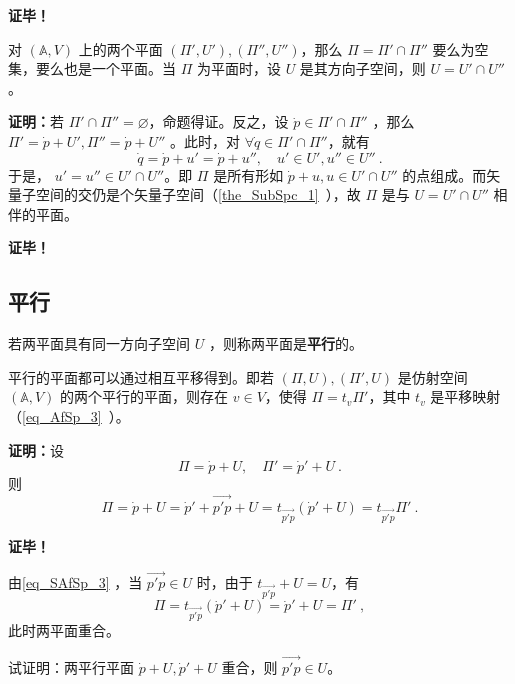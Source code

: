 \textbf{证毕！}
\begin{corollary}{}
对 $(\mathbb A,V)$ 上的两个平面 $(\Pi',U'),(\Pi'',U'')$，那么 $\Pi=\Pi'\cap\Pi''$ 要么为空集，要么也是一个平面。当 $\Pi$ 为平面时，设 $U$ 是其方向子空间，则 $U=U'\cap U''$。
\end{corollary}
\textbf{证明：}若 $\Pi'\cap\Pi''=\varnothing$，命题得证。反之，设 $\dot p\in \Pi'\cap\Pi''$ ，那么 $\Pi'=\dot p+U',\Pi''=\dot p+U''$ 。此时，对 $\forall\dot q\in\Pi'\cap\Pi''$，就有 \begin{equation}
\dot q=\dot p+u'=\dot p+u'',\quad u'\in U',u''\in U''~.
\end{equation}
于是， $u'=u''\in U'\cap U''$。即 $\Pi$ 是所有形如 $\dot p+u,u\in U'\cap U''$ 的点组成。而矢量子空间的交仍是个矢量子空间（\autoref{the_SubSpc_1}~），故 $\Pi$ 是与 $U=U'\cap U''$ 相伴的平面。

\textbf{证毕！}
\subsection{平行}

\begin{definition}{}
若两平面具有同一方向子空间 $U$ ，则称两平面是\textbf{平行}的。
\end{definition}
\begin{theorem}{}
平行的平面都可以通过相互平移得到。即若 $(\Pi,U),(\Pi',U)$ 是仿射空间 $(\mathbb A,V)$ 的两个平行的平面，则存在 $v\in V$，使得 $\Pi=t_{v}\Pi'$，其中 $t_v$ 是平移映射（\autoref{eq_AfSp_3}~）。
\end{theorem}
\textbf{证明：}设
\begin{equation}
\Pi=\dot p+U,\quad \Pi'=\dot p'+U~.
\end{equation}
则
\begin{equation}\label{eq_SAfSp_3}
\Pi=\dot p+U=\dot p'+\overrightarrow{p'p}+U=t_{\overrightarrow{p'p}}(\dot p'+U)=t_{\overrightarrow{p'p}} \Pi'~.
\end{equation}

\textbf{证毕！}

由\autoref{eq_SAfSp_3} ，当 $\overrightarrow{p'p}\in U$ 时，由于 $t_{\overrightarrow{p'p}}+U=U$，有
\begin{equation}
\Pi=t_{\overrightarrow{p'p}}(\dot p'+U)=\dot p'+U=\Pi'~,
\end{equation}
此时两平面重合。
\begin{exercise}{}
试证明：两平行平面 $\dot p+U,\dot p'+U$ 重合，则 $\overrightarrow{p'p}\in U$。
\end{exercise}